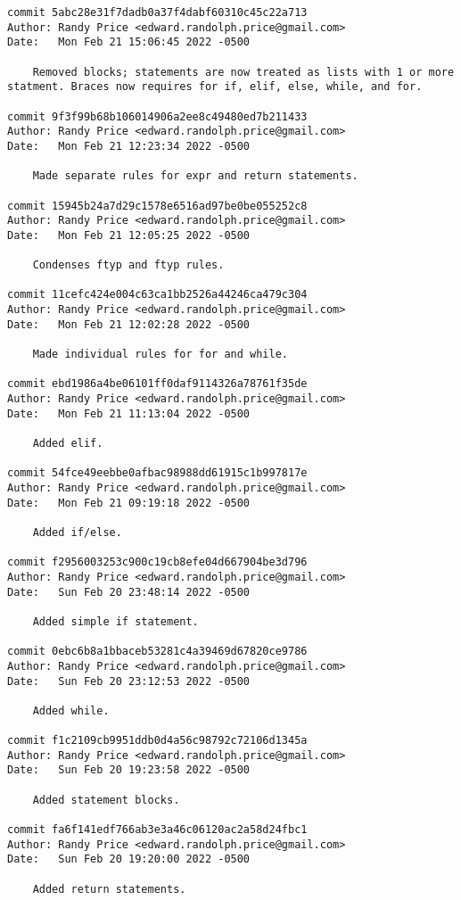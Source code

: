 {\begin{verbatim}
commit 5abc28e31f7dadb0a37f4dabf60310c45c22a713
Author: Randy Price <edward.randolph.price@gmail.com>
Date:   Mon Feb 21 15:06:45 2022 -0500

    Removed blocks; statements are now treated as lists with 1 or more statment. Braces now requires for if, elif, else, while, and for.

commit 9f3f99b68b106014906a2ee8c49480ed7b211433
Author: Randy Price <edward.randolph.price@gmail.com>
Date:   Mon Feb 21 12:23:34 2022 -0500

    Made separate rules for expr and return statements.

commit 15945b24a7d29c1578e6516ad97be0be055252c8
Author: Randy Price <edward.randolph.price@gmail.com>
Date:   Mon Feb 21 12:05:25 2022 -0500

    Condenses ftyp and ftyp rules.

commit 11cefc424e004c63ca1bb2526a44246ca479c304
Author: Randy Price <edward.randolph.price@gmail.com>
Date:   Mon Feb 21 12:02:28 2022 -0500

    Made individual rules for for and while.

commit ebd1986a4be06101ff0daf9114326a78761f35de
Author: Randy Price <edward.randolph.price@gmail.com>
Date:   Mon Feb 21 11:13:04 2022 -0500

    Added elif.

commit 54fce49eebbe0afbac98988dd61915c1b997817e
Author: Randy Price <edward.randolph.price@gmail.com>
Date:   Mon Feb 21 09:19:18 2022 -0500

    Added if/else.

commit f2956003253c900c19cb8efe04d667904be3d796
Author: Randy Price <edward.randolph.price@gmail.com>
Date:   Sun Feb 20 23:48:14 2022 -0500

    Added simple if statement.

commit 0ebc6b8a1bbaceb53281c4a39469d67820ce9786
Author: Randy Price <edward.randolph.price@gmail.com>
Date:   Sun Feb 20 23:12:53 2022 -0500

    Added while.

commit f1c2109cb9951ddb0d4a56c98792c72106d1345a
Author: Randy Price <edward.randolph.price@gmail.com>
Date:   Sun Feb 20 19:23:58 2022 -0500

    Added statement blocks.

commit fa6f141edf766ab3e3a46c06120ac2a58d24fbc1
Author: Randy Price <edward.randolph.price@gmail.com>
Date:   Sun Feb 20 19:20:00 2022 -0500

    Added return statements.


\end{verbatim}}
